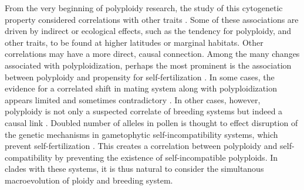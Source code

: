 From the very beginning of polyploidy research, the study of this cytogenetic property considered correlations with other traits \citep{stebbins1938}. 
Some of these associations are driven by indirect or ecological effects, such as the tendency for polyploidy, and other traits, to be found at higher latitudes or marginal habitats. %
Other correlations may have a more direct, causal connection.
Among the many changes associated with polyploidization, perhaps the most prominent is the association between polyploidy and propensity for self-fertilization \citep{stebbins1950, barrett1988}.
In some cases, the evidence for a correlated shift in mating system along with polyploidization appears limited and sometimes contradictory \citep{barringer2007, barrett2008, husband2008}.
In other cases, however, polyploidy is not only a suspected correlate of breeding systems but indeed a causal link \citep{stout1942, lewis1947}.
Doubled number of alleles in pollen is thought to effect disruption of the genetic mechanisms in gametophytic self-incompatibility systems, which prevent self-fertilization \citep{entani1999, tsukamoto2005, kubo2010}. 
This creates a correlation between polyploidy and self-compatibility by preventing the existence of self-incompatible polyploids.
In clades with these systems, it is thus natural to consider the simultanous macroevolution of ploidy and breeding system.


